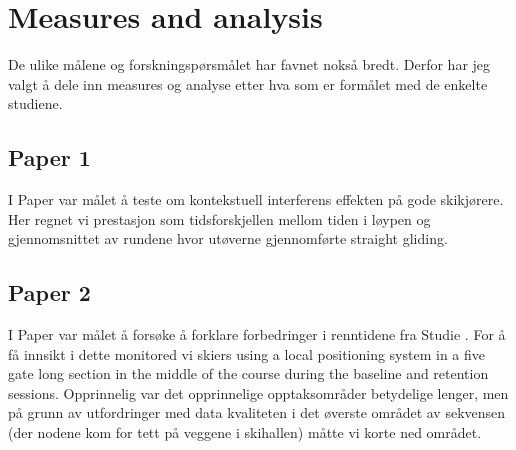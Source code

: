 





\section{Measures and analysis}
De ulike målene og forskningspørsmålet har favnet nokså bredt. Derfor har jeg valgt å dele inn measures og analyse etter hva som er formålet med de enkelte studiene. 


\subsection{Paper 1}
I Paper  var målet å teste om kontekstuell interferens effekten på gode skikjørere. Her regnet vi prestasjon som tidsforskjellen mellom tiden i løypen og gjennomsnittet av rundene hvor utøverne gjennomførte straight gliding. 


\subsection{Paper 2}
I Paper  var målet å forsøke å forklare forbedringer i renntidene fra Studie . For å få innsikt i dette monitored vi skiers using a local positioning system in a five gate long section in the middle of the course during the baseline and retention sessions. Opprinnelig var det opprinnelige opptaksområder betydelige lenger, men på grunn av utfordringer med data kvaliteten i det øverste området av sekvensen (der nodene kom for tett på veggene i skihallen) måtte vi korte ned området. 

